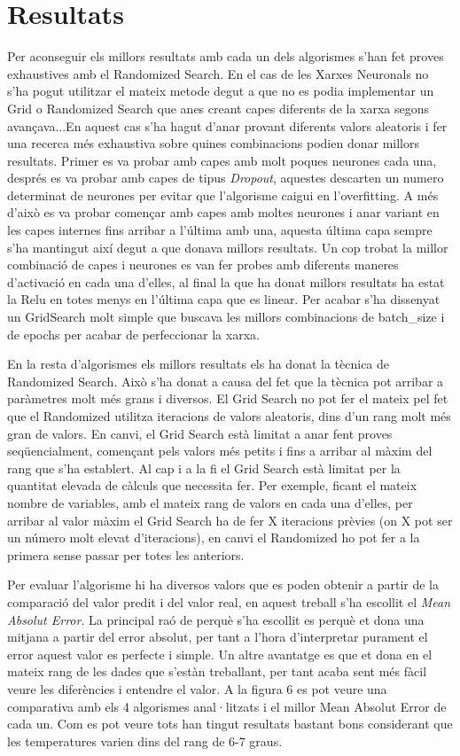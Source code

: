\documentclass[10pt,a4paper,twocolumn,twoside]{article}
\begin{document}
\section{Resultats}
Per aconseguir els millors resultats amb cada un dels algorismes s'han fet proves exhaustives amb el Randomized Search. En el cas de les Xarxes Neuronals no s'ha pogut utilitzar el mateix metode degut a que no es podia implementar un Grid o Randomized Search que anes creant capes diferents de la xarxa segons avançava...En aquest cas s'ha hagut d'anar provant diferents valors aleatoris i fer una recerca més exhaustiva sobre quines combinacions podien donar millors resultats. Primer es va probar amb capes amb molt poques neurones cada una, després es va probar amb capes de tipus \textit{Dropout}, aquestes descarten un numero determinat de neurones per evitar que l'algorisme caigui en l'overfitting. A més d'això es va probar començar amb capes amb moltes neurones i anar variant en les capes internes fins arribar a l'última amb una, aquesta última capa sempre s'ha mantingut així degut a que donava millors resultats. Un cop trobat la millor combinació de capes i neurones es van fer probes amb diferents maneres d'activació en cada una d'elles, al final la que ha donat millors resultats ha estat la Relu en totes menys en l'última capa que es linear. Per acabar s'ha dissenyat un GridSearch molt simple que buscava les millors combinacions de batch\_size i de epochs per acabar de perfeccionar la xarxa.

En la resta d'algorismes els millors resultats els ha donat la tècnica de Randomized Search. Això s'ha donat a causa del fet que la tècnica pot arribar a paràmetres molt més grans i diversos. El Grid Search no pot fer el mateix pel fet que el Randomized utilitza iteracions de valors aleatoris, dins d'un rang molt més gran de valors. En canvi, el Grid Search està limitat a anar fent proves seqüencialment, començant pels valors més petits i fins a arribar al màxim del rang que s'ha establert. Al cap i a la fi el Grid Search està limitat per la quantitat elevada de càlculs que necessita fer. Per exemple, ficant el mateix nombre de variables, amb el mateix rang de valors en cada una d'elles, per arribar al valor màxim el Grid Search ha de fer X iteracions prèvies (on X pot ser un número molt elevat d'iteracions), en canvi el Randomized ho pot fer a la primera sense passar per totes les anteriors.

Per evaluar l'algorisme hi ha diversos valors que es poden obtenir a partir de la comparació del valor predit i del valor real, en aquest treball s'ha escollit el \textit{Mean Absolut Error}. La principal raó de perquè s'ha escollit es perquè et dona una mitjana a partir del error absolut, per tant a l'hora d'interpretar purament el error aquest valor es perfecte i simple. Un altre avantatge es que et dona en el mateix rang de les dades que s'estàn treballant, per tant acaba sent més fàcil veure les diferències i entendre el valor. A la figura 6 es pot veure una comparativa amb els 4 algorismes anal·litzats i el millor Mean Absolut Error de cada un. Com es pot veure tots han tingut resultats bastant bons considerant que les temperatures varien dins del rang de 6-7 graus.
\end{document}
